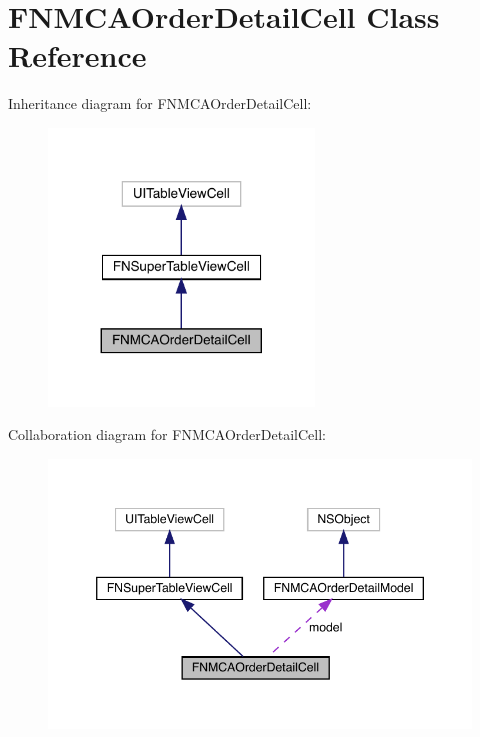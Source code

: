 \hypertarget{interface_f_n_m_c_a_order_detail_cell}{}\section{F\+N\+M\+C\+A\+Order\+Detail\+Cell Class Reference}
\label{interface_f_n_m_c_a_order_detail_cell}


Inheritance diagram for F\+N\+M\+C\+A\+Order\+Detail\+Cell\+:\nopagebreak
\begin{figure}[H]
\begin{center}
\leavevmode
\includegraphics[width=200pt]{interface_f_n_m_c_a_order_detail_cell__inherit__graph}
\end{center}
\end{figure}


Collaboration diagram for F\+N\+M\+C\+A\+Order\+Detail\+Cell\+:\nopagebreak
\begin{figure}[H]
\begin{center}
\leavevmode
\includegraphics[width=346pt]{interface_f_n_m_c_a_order_detail_cell__coll__graph}
\end{center}
\end{figure}
